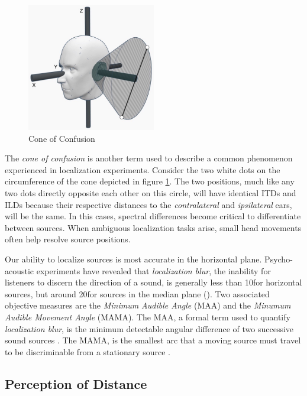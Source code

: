 \begin{figure}[ht!]%
\centering
\includegraphics[width=0.5\textwidth]{img/cone_confusion.JPG}
\caption{Cone of Confusion}
\label{fig:cone-confusion}
\end{figure}

The \textit{cone of confusion} is another term used to describe a common phenomenon experienced in localization experiments. Consider the two white dots on the circumference of the cone depicted in figure \ref{fig:cone-confusion}. The two positions, much like any two dots directly opposite each other on this circle, will have identical ITDs and ILDs because their respective distances to the \textit{contralateral} and \textit{ipsilateral} ears, will be the same. In this cases, spectral differences become critical to differentiate between sources. When ambiguous localization tasks arise, small head movements often help resolve source positions.

Our ability to localize sources is most accurate in the horizontal plane. Psycho-acoustic experiments have revealed that \textit{localization blur}, the inability for listeners to discern the direction of a sound, is generally less than 10\textdegree for horizontal sources, but around 20\textdegree for sources in the median plane (\cite{hacihabiboglu2017perceptual}). Two associated objective measures are the \textit{Minimum Audible Angle} (MAA) and the \textit{Minumum Audible Movement Angle} (MAMA). The MAA, a formal term used to quantify \textit{localization blur}, is the minimum detectable angular difference of two successive sound sources \cite{reardon2017evaluation}. The MAMA, is the smallest arc that a moving source must travel to be discriminable from a stationary source \cite{moore1995hearing}.

\subsection{Perception of Distance}

